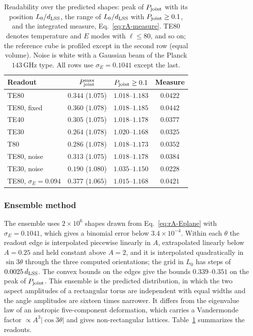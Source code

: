 \begin{table}[tbp]
\centering
\caption{Readability over the predicted shapes: peak of $P_{\rm joint}$ with its position $L_0/d_{\mathrm{LSS}}$, the range of $L_0/d_{\mathrm{LSS}}$ with $P_{\rm joint}\geq0.1$, and the integrated measure, Eq.~\eqref{eq:rA-measure}. TE80 denotes temperature and $E$ modes with $\ell\leq80$, and so on; the reference cube is profiled except in the second row (equal volume). Noise is white with a Gaussian beam of the Planck $143$\,GHz type. All rows use $\sigma_E=0.1041$ except the last.}
\label{tab:rA-variants}
\begin{tabular}{lccc}
\toprule
Readout & $P_{\rm joint}^{\max}$ & $P_{\rm joint}\geq0.1$ & Measure\\
\midrule
TE80 & $0.344$ ($1.075$) & $1.018$--$1.183$ & $0.0422$\\ %
TE80, fixed & $0.360$ ($1.078$) & $1.018$--$1.185$ & $0.0442$\\ %
TE40 & $0.305$ ($1.075$) & $1.018$--$1.178$ & $0.0377$\\ %
TE30 & $0.264$ ($1.078$) & $1.020$--$1.168$ & $0.0325$\\ %
T80 & $0.286$ ($1.078$) & $1.018$--$1.173$ & $0.0352$\\ %
TE80, noise & $0.313$ ($1.075$) & $1.018$--$1.178$ & $0.0384$\\ %
TE30, noise & $0.190$ ($1.080$) & $1.035$--$1.150$ & $0.0228$\\ %
TE80, $\sigma_E=0.094$ & $0.377$ ($1.065$) & $1.015$--$1.168$ & $0.0421$\\ %
\bottomrule
\end{tabular}
\end{table}

\subsubsection{Ensemble method}
\label{rA:c-ens}

The ensemble uses $2\times10^6$ shapes drawn from Eq.~\eqref{eq:rA-Eplane} with $\sigma_E=0.1041$, which gives a binomial error below $3.4\times10^{-4}$. %
Within each $\theta$ the readout edge is interpolated piecewise linearly in $A$, extrapolated linearly below $A=0.25$ and held constant above $A=2$, and it is interpolated quadratically in $\sin3\theta$ through the three computed orientations; the grid in $L_0$ has steps of $0.0025\,d_{\mathrm{LSS}}$. %
The convex bounds on the edges give the bounds $0.339$--$0.351$ on the peak of $P_{\rm joint}$. %
This ensemble is the predicted distribution, in which the two aspect amplitudes of a rectangular torus are independent with equal widths and the angle amplitudes are sixteen times narrower.
It differs from the eigenvalue law of an isotropic five-component deformation, which carries a Vandermonde factor $\propto A^3|\cos3\theta|$ and gives non-rectangular lattices. %
Table~\ref{tab:rA-variants} summarizes the readouts.

